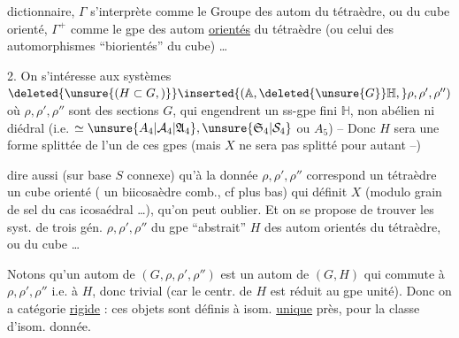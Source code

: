 
dictionnaire, $\Gamma$ s'interprète comme le  Groupe des autom du tétraèdre, ou du cube orienté, $\Gamma^{+}$ comme le gpe des autom \uline{orientés} du tétraèdre (ou celui des automorphismes ``biorientés'' du cube) \ldots

2. On s'intéresse  aux systèmes $\deleted{\unsure{(H\subset G,)}}\inserted{(\mathbb A,\deleted{\unsure{G}}\mathbb H,}\rho,\rho',\rho'')$ où $\rho,\rho',\rho''$ sont des sections   $G$,  qui engendrent un ss-gpe fini $\mathbb H$, non abélien ni diédral (i.e. $\simeq \unsure{A_4|\mathcal A_4|\mathfrak A_4},\unsure{\mathfrak S_4|\mathcal S_4}$ ou $A_5$) -- Donc $H$ sera une forme splittée de l'un de ces gpes (mais $X$  ne sera pas splitté pour autant --)


  dire aussi (sur base $S$ connexe) qu'à la donnée $\rho,\rho',\rho''$ correspond un tétraèdre   un cube orienté  ( un biicosaèdre comb., cf plus bas) qui définit $X$ (modulo grain de sel du cas icosaédral \ldots), qu'on peut oublier. Et on se propose de trouver les syst. de trois gén. $\rho,\rho',\rho''$ du gpe  ``abstrait'' $H$ des autom orientés du  tétraèdre, ou du cube \ldots\ 

Notons qu'un autom de $(G,\rho,\rho',\rho'')$ est un autom de $(G,H)$ qui commute à $\rho,\rho',\rho''$ i.e. à $H$, donc  trivial (car le centr. de $H$ est réduit au gpe unité). Donc on a catégorie \uline{rigide} : ces objets sont définis à isom. \uline{unique} près, pour la classe d'isom. donnée.

